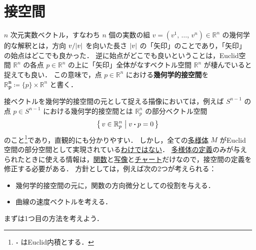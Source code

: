 \documentclass[geometry_main]{subfiles}
\begin{document}
\section{接空間}


$n$ 次元実数ベクトル，すなわち $n$ 個の実数の組 $v = (v^1,\, \dots ,\, v^n) \in \mathbb{R}^n$ の幾何学的な解釈とは，方向 $v/\abs{v}$ を向いた長さ $\abs{v}$ の「矢印」のことであり，「矢印」の始点はどこでも良かった．
逆に始点がどこでも良いということは，Euclid空間 $\mathbb{R}^n$ の各点 $p \in \mathbb{R}^n$ の上に「矢印」全体がなすベクトル空間 $\mathbb{R}^n$ が棲んでいると捉えても良い．
この意味で，点 $p \in \mathbb{R}^n$ における\textbf{幾何学的接空間}を $\bm{\mathbb{R}^n_p} \coloneqq \{p\} \times \mathbb{R}^n$ と書く．

接ベクトルを幾何学的接空間の元として捉える描像においては，例えば $S^{n-1}$ の点 $p \in S^{n-1}$ における幾何学的接空間とは $\mathbb{R}^n_p$ の部分ベクトル空間
\begin{align}
	\bigl\{\, v \in \mathbb{R}_p^n \bigm| v \vdot p = 0 \,\bigr\} 
\end{align}
のこと\footnote{$\vdot$ はEuclid内積とする．}であり，直観的にも分かりやすい．
しかし，全ての\hyperref[diffmani]{\cinfty 多様体} $M$ がEuclid空間の部分空間として実現されている\underline{わけではない}．
\hyperref[diffmani]{\cinfty 多様体の定義}のみが与えられたときに使える情報は，\hyperref[def.cinfty]{\cinfty 関数}と\hyperref[def.cinfty_mapping]{\cinfty 写像}と\hyperref[diffmani]{\cinfty チャート}だけなので，接空間の定義を修正する必要がある．
方針としては，例えば次の2つが考えられる：
\begin{itemize}
	\item 幾何学的接空間の元に，\cinfty 関数の方向微分としての役割を与える．
	\item \cinfty 曲線の速度ベクトルを考える．
\end{itemize}
まずは1つ目の方法を考えよう．
\end{document}
